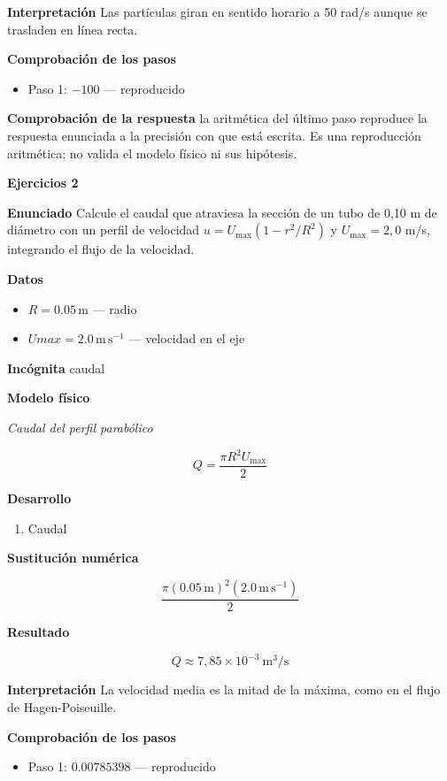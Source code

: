 \documentclass[10pt,openany]{book}
\begin{document}
\noindent\textbf{Interpretación}
Las partículas giran en sentido horario a 50 rad/s aunque se trasladen en línea recta.

\noindent\textbf{Comprobación de los pasos}
\begin{itemize}
\item Paso 1: $-100$ — reproducido
\end{itemize}

\noindent\textbf{Comprobación de la respuesta} la aritmética del último paso reproduce la respuesta enunciada a la precisión con que está escrita. Es una reproducción aritmética; no valida el modelo físico ni sus hipótesis.

\noindent\textbf{Ejercicios 2}

\noindent\textbf{Enunciado}
Calcule el caudal que atraviesa la sección de un tubo de 0,10 m de diámetro con un perfil de velocidad \(u = U_{\max}(1 - r^{2}/R^{2})\) y \(U_{\max} = 2{,}0\) m/s, integrando el flujo de la velocidad.

\noindent\textbf{Datos}
\begin{itemize}
\item $R = 0.05\,\mathrm{m}$ — radio
\item $Umax = 2.0\,\mathrm{m}\,\mathrm{s}^{-1}$ — velocidad en el eje
\end{itemize}

\noindent\textbf{Incógnita}
caudal

\noindent\textbf{Modelo físico}

\noindent\textit{Caudal del perfil parabólico}

\[
Q = \frac{\pi R^{2}U_{\max}}{2}
\]

\noindent\textbf{Desarrollo}
\begin{enumerate}
\item
Caudal
\end{enumerate}

\noindent\textbf{Sustitución numérica}

\[
\frac{\pi \left(0.05\,\mathrm{m}\right)^{2} \left(2.0\,\mathrm{m}\,\mathrm{s}^{-1}\right)}{2}
\]

\noindent\textbf{Resultado}

\[
Q \approx 7{,}85\times 10^{-3}\ \mathrm{m^{3}/s}
\]

\noindent\textbf{Interpretación}
La velocidad media es la mitad de la máxima, como en el flujo de Hagen-Poiseuille.

\noindent\textbf{Comprobación de los pasos}
\begin{itemize}
\item Paso 1: $0.00785398$ — reproducido
\end{itemize}
\end{document}
